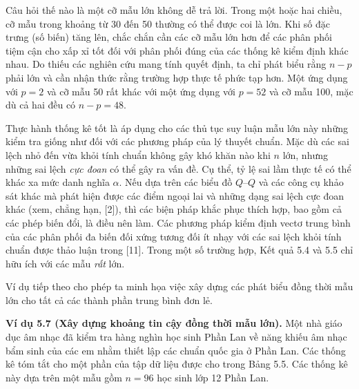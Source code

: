 \medskip
Câu hỏi thế nào là một cỡ mẫu lớn không dễ trả lời. Trong một hoặc hai chiều, cỡ mẫu trong khoảng từ 30 đến 50 thường có thể được coi là lớn. Khi số đặc trưng (số biến) tăng lên, chắc chắn cần các cỡ mẫu lớn hơn để các phân phối tiệm cận cho xấp xỉ tốt đối với phân phối đúng của các thống kê kiểm định khác nhau. Do thiếu các nghiên cứu mang tính quyết định, ta chỉ phát biểu rằng $n-p$ phải lớn và cần nhận thức rằng trường hợp thực tế phức tạp hơn. Một ứng dụng với $p=2$ và cỡ mẫu 50 rất khác với một ứng dụng với $p=52$ và cỡ mẫu 100, mặc dù cả hai đều có $n-p=48$.

Thực hành thống kê tốt là áp dụng cho các thủ tục suy luận mẫu lớn này những kiểm tra giống như đối với các phương pháp của lý thuyết chuẩn. Mặc dù các sai lệch nhỏ đến vừa khỏi tính chuẩn không gây khó khăn nào khi $n$ lớn, nhưng những sai lệch \emph{cực đoan} có thể gây ra vấn đề. Cụ thể, tỷ lệ sai lầm thực tế có thể khác xa mức danh nghĩa $\alpha$. Nếu dựa trên các biểu đồ $Q$--$Q$ và các công cụ khảo sát khác mà phát hiện được các điểm ngoại lai và những dạng sai lệch cực đoan khác (xem, chẳng hạn, [2]), thì các biện pháp khắc phục thích hợp, bao gồm cả các phép biến đổi, là điều nên làm. Các phương pháp kiểm định vectơ trung bình của các phân phối đa biến đối xứng tương đối ít nhạy với các sai lệch khỏi tính chuẩn được thảo luận trong [11]. Trong một số trường hợp, Kết quả 5.4 và 5.5 chỉ hữu ích với các mẫu \emph{rất} lớn.

Ví dụ tiếp theo cho phép ta minh họa việc xây dựng các phát biểu đồng thời mẫu lớn cho tất cả các thành phần trung bình đơn lẻ.

\medskip
\noindent\textbf{Ví dụ 5.7 (Xây dựng khoảng tin cậy đồng thời mẫu lớn).} Một nhà giáo dục âm nhạc đã kiểm tra hàng nghìn học sinh Phần Lan về năng khiếu âm nhạc bẩm sinh của các em nhằm thiết lập các chuẩn quốc gia ở Phần Lan. Các thống kê tóm tắt cho một phần của tập dữ liệu được cho trong Bảng 5.5. Các thống kê này dựa trên một mẫu gồm $n=96$ học sinh lớp 12 Phần Lan.

